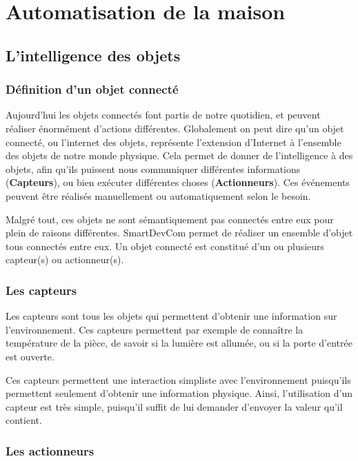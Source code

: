 \chapter{Automatisation de la maison}

\section{L’intelligence des objets}
	\subsection{Définition d’un objet connecté}
Aujourd'hui les objets connectés font partis de notre quotidien, et peuvent réaliser énormément 
d'actions différentes. Globalement on peut dire qu'un objet connecté, ou l'internet des objets, représente 
l'extension d'Internet à l'ensemble des objets de notre monde physique. Cela permet de donner de 
l'intelligence à des objets, afin qu'ils puissent nous communiquer différentes informations 
(\textbf{Capteurs}), ou bien exécuter différentes choses (\textbf{Actionneurs}). Ces événements peuvent être 
réalisés manuellement ou automatiquement selon le besoin.

Malgré tout, ces objets ne sont sémantiquement pas connectés entre eux pour plein de raisons différentes. 
SmartDevCom permet de réaliser un ensemble d'objet tous connectés entre eux. Un objet connecté est constitué 
d'un ou plusieurs capteur(s) ou actionneur(s).
	\subsection{Les capteurs}
	
Les capteurs sont tous les objets qui permettent d'obtenir une information sur l'environnement. Ces capteurs 
permettent par exemple de connaître la température de la pièce, de savoir si la lumière est allumée, ou si la 
porte d'entrée est ouverte.

Ces capteurs permettent une interaction simpliste avec l'environnement puisqu'ils permettent seulement 
d'obtenir une information physique. Ainsi, l'utilisation d'un capteur est très simple, puisqu'il suffit de 
lui demander d'envoyer la valeur qu'il contient.
	\subsection{Les actionneurs}
	

